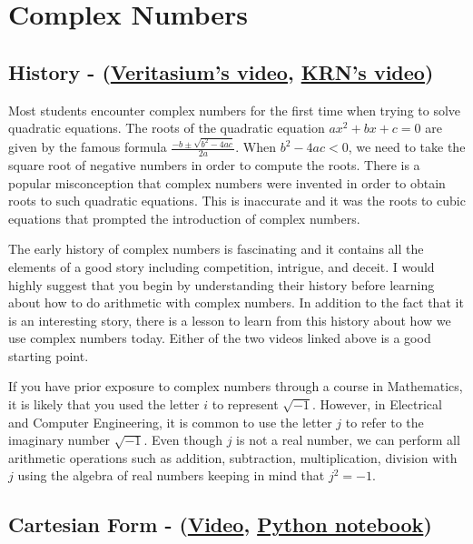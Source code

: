 \chapter{Complex Numbers}

\section{History -
(\href{https://www.youtube.com/watch?v=cUzklzVXJwo}{Veritasium's video},
\href{https://youtu.be/UeRNIxt8o00}{KRN's video})}
Most students encounter complex numbers for the first time when trying to solve quadratic equations.
The roots of the quadratic equation $ax^2+bx+c = 0$ are given by the famous formula $\frac{-b \pm \sqrt{b^2-4ac}}{2a}$. When $b^2-4ac < 0$, we need to take the square root of negative numbers in order to compute the roots.  
There is a popular misconception that complex numbers were invented in order to obtain roots to such quadratic equations.
This is inaccurate and it was the roots to cubic equations that prompted the introduction of complex numbers.

The early history of complex numbers is fascinating and it contains all the elements of a good story including competition, intrigue, and deceit. I would highly suggest that you begin
by understanding their history before learning about how to do arithmetic with complex numbers.
In addition to the fact that it is an interesting story, there is a lesson to learn from this history about how we use complex numbers today.
Either of the two videos linked above is a good starting point.

If you have prior exposure to complex numbers through a course in Mathematics, it is likely that you used the letter $i$ to represent $\sqrt{-1}$. However, in Electrical and Computer Engineering,
it is common to use the letter $j$ to refer to the imaginary number $\sqrt{-1}$.
Even though $j$ is not a real number, we can perform all arithmetic operations such as addition, subtraction, multiplication, division with $j$ using the algebra of real numbers keeping in mind that $j^2=-1$.

\section{Cartesian Form - (\href{https://youtu.be/fUEwjQBs6FU}{Video},
\href{https://colab.research.google.com/drive/1IPisKbolmXp2UD7ZuxIRhMEjvaq_Q82G?usp=sharing}{Python notebook})}

